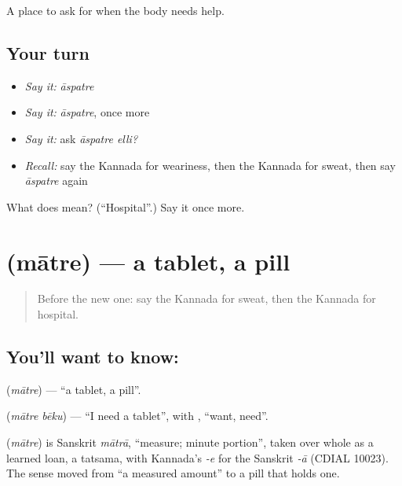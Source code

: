\begin{grammarlens}[title={What you've built}]
A place to ask for when the body needs help.
\end{grammarlens}

\subsection*{Your turn}
\begin{itemize}
\raggedright
  \item \emph{Say it:} \emph{āspatre}
  \item \emph{Say it:} \emph{āspatre}, once more
  \item \emph{Say it:} ask \emph{āspatre elli?}
  \item \emph{Recall:} say the Kannada for weariness, then the Kannada for sweat, then say \emph{āspatre} again
\end{itemize}

\begin{tcolorbox}[breakable,colback=teal!4,colframe=teal!35!black,title={Before you move on}]
What does  mean? (\textquotedblleft{}Hospital\textquotedblright{}.) Say it once more.
\end{tcolorbox}
\section[\texorpdfstring{\kn{ಮಾತ್ರೆ} (mātre)}{ಮಾತ್ರೆ (mātre)}]{ (mātre) — a tablet, a pill}

\label{lesson:KA-C84-tablet}



\begin{quote}
Before the new one: say the Kannada for sweat, then the Kannada for hospital.
\end{quote}

\subsection*{You'll want to know: }
\textbf{} (\emph{mātre}) — \textquotedblleft{}a tablet, a pill\textquotedblright{}.

\textbf{ } (\emph{mātre bēku}) — \textquotedblleft{}I need a tablet\textquotedblright{}, with \textbf{}, \textquotedblleft{}want, need\textquotedblright{}.

\begin{cousinweb}
\textbf{} (\emph{mātre}) is Sanskrit \emph{mātrā}, \textquotedblleft{}measure; minute portion\textquotedblright{}, taken over whole as a learned loan, a tatsama, with Kannada's \emph{-e} for the Sanskrit \emph{-ā} (CDIAL 10023). The sense moved from \textquotedblleft{}a measured amount\textquotedblright{} to a pill that holds one.
\end{cousinweb}

